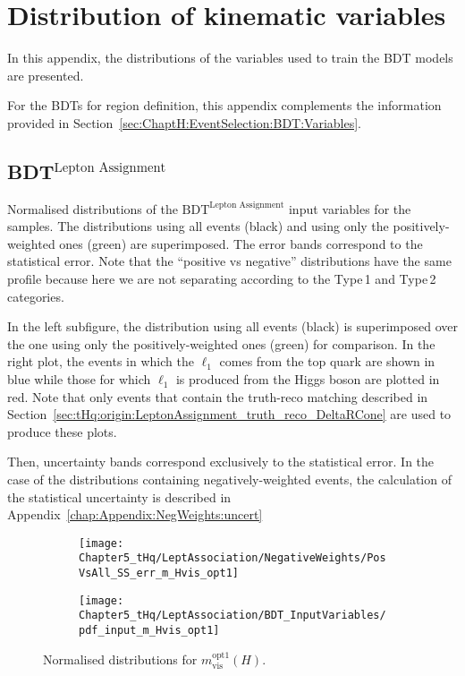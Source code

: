 \chapter{Distribution of kinematic variables}
\label{chap:Appendix:BDT_Variables}
In this appendix, the distributions of the variables used to train the BDT models are presented.

For the BDTs for region definition, this appendix complements the information provided
in Section~\ref{sec:ChaptH:EventSelection:BDT:Variables}. 



\section{BDT$^{\text{Lepton Assignment}}$}
\label{chap:Appendix:BDT_Variables:LepAssignment}

Normalised distributions of the $\text{BDT}^{\text{Lepton Assignment}}$ input variables for the \dilepSStau samples. 
The distributions using all events (black) and using only the positively-weighted ones (green)
are superimposed. The error bands correspond to the statistical error. 
Note that the ``positive vs negative'' distributions have the same profile because here we are not separating
according to the Type$\,$1 and Type$\,$2 categories. 

In the left subfigure, the distribution using all events (black) is superimposed over the one 
using only the positively-weighted ones (green) for comparison.  
In the right plot, the events in which the $\ell_{1}$ comes from the top quark
are shown in blue while those for which $\ell_{1}$ is produced from the Higgs boson
are plotted in red. Note that only events that contain the truth-reco matching described 
in Section~\ref{sec:tHq:origin:LeptonAssignment_truth_reco_DeltaRCone} are used to produce these plots.

Then, uncertainty bands correspond exclusively to the statistical error. 
In the case of the distributions containing negatively-weighted events, 
the calculation of the statistical uncertainty is described in Appendix~\ref{chap:Appendix:NegWeights:uncert}

\begin{figure}[h]
\centering
\begin{subfigure}{.45\textwidth}
  \centering
  \texttt{[image: Chapter5\_tHq/LeptAssociation/NegativeWeights/PosVsAll\_SS\_err\_m\_Hvis\_opt1]}
\end{subfigure}%
\begin{subfigure}{.46\textwidth}
  \centering
  \texttt{[image: Chapter5\_tHq/LeptAssociation/BDT\_InputVariables/pdf\_input\_m\_Hvis\_opt1]}
\end{subfigure}
\caption{Normalised distributions for $m^{\text{opt1}}_{\text{vis}}(H)$.}
\label{fig:Appendix:BDTVARS:LeptonAssignment:m_Hvis_opt1}
\end{figure}

